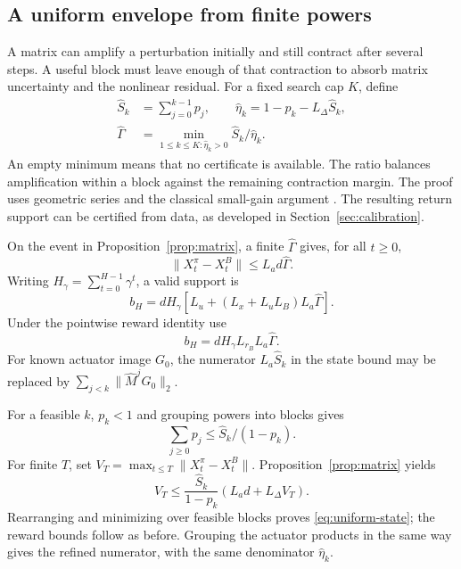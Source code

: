 \documentclass[twocolumn,nameyear]{autart}
\begin{document}
\subsection{A uniform envelope from finite powers}\label{sec:blocks}
A matrix can amplify a perturbation initially and still contract after
several steps. A useful block must leave enough of that contraction to
absorb matrix uncertainty and the nonlinear residual. For a fixed search
cap $K$, define
\begin{align}\label{eq:block-margin}
 \widehat S_k&=\sum_{j=0}^{k-1}p_j,\qquad
 \widehat\eta_k=1-p_k-L_\Delta\widehat S_k,\nonumber\\
 \widehat\Gamma&=\min_{1\le k\le K:\widehat\eta_k>0}
                   \widehat S_k/\widehat\eta_k.
\end{align}
An empty minimum means that no certificate is available. The ratio
balances amplification within a block against the remaining contraction
margin. The proof uses geometric series and the classical small-gain
argument \citep{doyle1992feedback}. The resulting return support can
be certified from data, as developed in Section~\ref{sec:calibration}.

\begin{cor}\label{cor:blocks}
On the event in Proposition~\ref{prop:matrix}, a
finite $\widehat\Gamma$ gives, for all $t\ge0$,
\begin{equation}\label{eq:uniform-state}
 \|X_t^\pi-X_t^B\|\le L_ad\widehat\Gamma.
\end{equation}
Writing $H_\gamma=\sum_{t=0}^{H-1}\gamma^t$, a valid support is
\begin{equation}\label{eq:block-support}
 b_H=dH_\gamma[L_u+(L_x+L_uL_B)L_a\widehat\Gamma].
\end{equation}
Under the pointwise reward identity use
\[
 b_H=dH_\gamma L_{r_B}L_a\widehat\Gamma.
\]
For known actuator image $G_0$, the numerator $L_a\widehat S_k$
in the state bound may be replaced by
$\sum_{j<k}\|\widehat M^jG_0\|_2$.
\end{cor}
\begin{pf}
For a feasible $k$, $p_k<1$ and grouping powers into blocks gives
\[
 \sum_{j\ge0}p_j\le\widehat S_k/(1-p_k).
\]
For finite $T$, set $V_T=\max_{t\le T}\|X_t^\pi-X_t^B\|$.
Proposition~\ref{prop:matrix} yields
\[
 V_T\le\frac{\widehat S_k}{1-p_k}(L_ad+L_\Delta V_T).
\]
Rearranging and minimizing over feasible blocks proves
\eqref{eq:uniform-state}; the reward bounds follow as before.
Grouping the actuator products in the same way gives the refined
numerator, with the same denominator $\widehat\eta_k$.
\end{pf}
\end{document}
